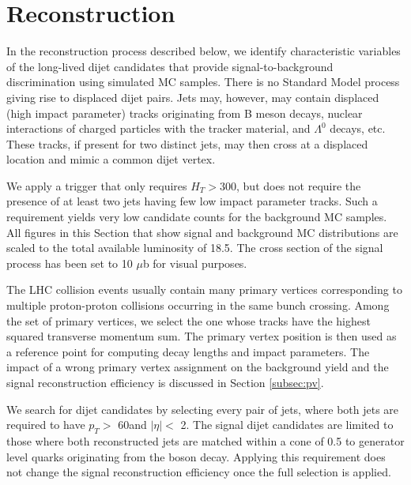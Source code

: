 
\section{Reconstruction}

In the reconstruction process described below, we identify characteristic variables
of the long-lived dijet candidates that provide
signal-to-background discrimination using simulated MC samples.    
There is no Standard Model process giving rise to displaced dijet pairs. Jets may,
however, may contain displaced (high impact parameter) tracks originating from B meson decays, nuclear
interactions of charged particles with the tracker material, \Kshort and $\Lambda^0$ decays, etc. These tracks, if 
present for two distinct jets,
may then cross at a displaced location and mimic a common dijet vertex. 

We apply a trigger that only requires $H_T>$300\GeV, but does not require
the presence of at least two jets having few low impact parameter tracks. Such a requirement
yields very low
candidate counts for the background MC samples.
All figures in this Section that show signal and background MC distributions 
are scaled to the total available luminosity
of 18.5\fbinv. 
The cross section of the signal process has been set to 10 $\mu$b for visual purposes.   

The LHC collision events usually contain many primary vertices corresponding to multiple proton-proton collisions occurring 
in the same bunch crossing.
Among the set of primary vertices, we select the one whose tracks have the highest squared transverse momentum sum.
 The primary vertex position is
then used as a reference point for computing decay lengths and impact parameters. The impact of a wrong
primary vertex assignment on the background yield and the signal reconstruction efficiency is discussed
in Section \ref{subsec:pv}. 


We search for dijet candidates by selecting every pair of jets, where both jets are required
to have $p_T>$ 60\GeV and $|\eta|<$ 2. 
The signal dijet candidates are limited
to those where both reconstructed jets are matched within a cone of 0.5 to generator level quarks originating
 from the \X boson decay. Applying this requirement does not change the signal reconstruction efficiency
once the full selection is applied. 

